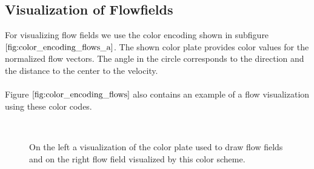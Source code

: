 \subsection{Visualization of Flowfields}
For visualizing flow fields we use the color encoding shown in subfigure $\ref{fig:color_encoding_flows_a}$. The shown color plate provides color values for the normalized flow vectors. The angle in the circle corresponds to the direction and the distance to the center to the velocity. \\ \\
Figure $\ref{fig:color_encoding_flows}$ also contains an example of a flow visualization using these color codes.
\begin{figure}[H]
\begin{center}
~
\end{center}
\caption[Visual Color Encoding of Flow Fields]{On the left a visualization of the color plate used to draw flow fields and on the right flow field visualized by this color scheme.}
\label{fig:color_encoding_flows}
\end{figure}

